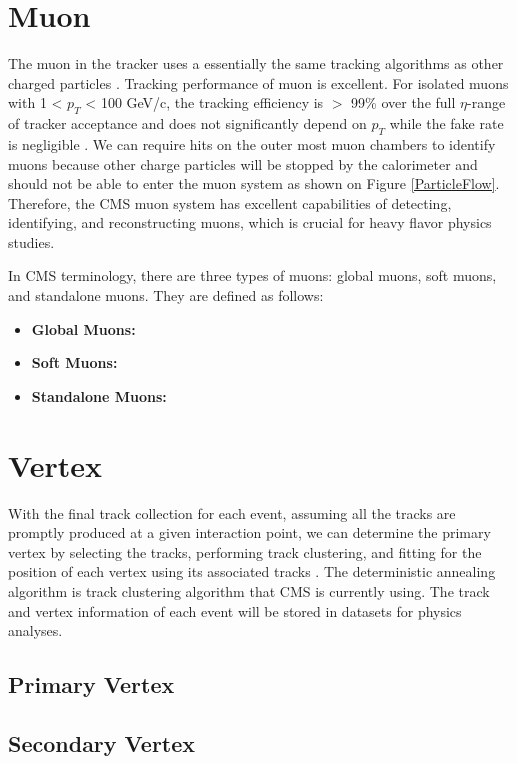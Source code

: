 \section{Muon}

The muon in the tracker uses a essentially the same tracking algorithms as other charged particles \cite{CMSTrackComp}. Tracking performance of muon is excellent. For isolated muons with 1 < $p_T$ < 100 GeV/c, the tracking efficiency is $>$ 99\% over the full $\eta$-range of tracker acceptance and does not significantly depend on $p_T$ while the fake rate is negligible \cite{CMSTrackComp}. We can require hits on the outer most muon chambers to identify muons because other charge particles will be stopped by the calorimeter and should not be able to enter the muon system as shown on Figure \ref{ParticleFlow}. Therefore, the CMS muon system has excellent capabilities of detecting, identifying, and reconstructing muons, which is crucial for heavy flavor physics studies. 

In CMS terminology, there are three types of muons: global muons, soft muons, and standalone muons. They are defined as follows:


\begin{itemize}
\item \textbf{Global Muons:}
\item \textbf{Soft Muons:}
\item \textbf{Standalone Muons:}
\end{itemize}


\section{Vertex}

With the final track collection for each event, assuming all the tracks are promptly produced at a given interaction point, we can determine the primary vertex by selecting the tracks, performing track clustering, and fitting for the position of each vertex using its associated tracks \cite{CMSTrackComp}. The deterministic annealing algorithm \cite{DAAlgo} is track clustering algorithm that CMS is currently using. The track and vertex information of each event will be stored in datasets for physics analyses.

\subsection{Primary Vertex}

\subsection{Secondary Vertex}



